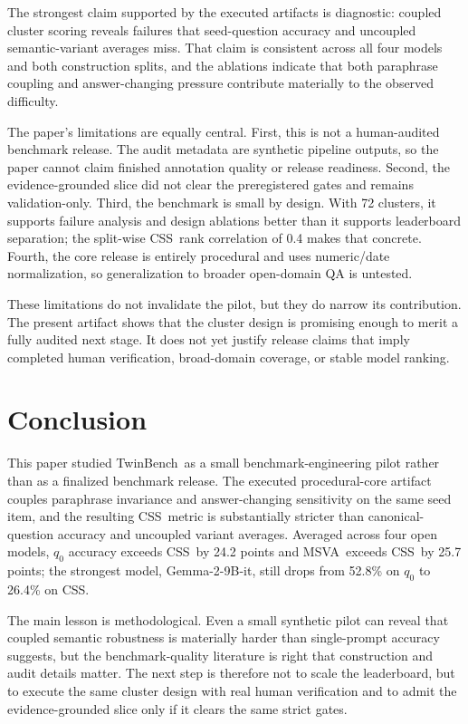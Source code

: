 \documentclass{article}
\newcommand{\tb}{TwinBench}
\newcommand{\css}{\textsc{CSS}}
\newcommand{\msva}{\textsc{MSVA}}
\begin{document}
The strongest claim supported by the executed artifacts is diagnostic: coupled cluster scoring reveals failures that seed-question accuracy and uncoupled semantic-variant averages miss. That claim is consistent across all four models and both construction splits, and the ablations indicate that both paraphrase coupling and answer-changing pressure contribute materially to the observed difficulty.

The paper's limitations are equally central. First, this is not a human-audited benchmark release. The audit metadata are synthetic pipeline outputs, so the paper cannot claim finished annotation quality or release readiness. Second, the evidence-grounded slice did not clear the preregistered gates and remains validation-only. Third, the benchmark is small by design. With 72 clusters, it supports failure analysis and design ablations better than it supports leaderboard separation; the split-wise \css\ rank correlation of 0.4 makes that concrete. Fourth, the core release is entirely procedural and uses numeric/date normalization, so generalization to broader open-domain QA is untested.

These limitations do not invalidate the pilot, but they do narrow its contribution. The present artifact shows that the cluster design is promising enough to merit a fully audited next stage. It does not yet justify release claims that imply completed human verification, broad-domain coverage, or stable model ranking.

\section{Conclusion}
\label{sec:conclusion}

This paper studied \tb\ as a small benchmark-engineering pilot rather than as a finalized benchmark release. The executed procedural-core artifact couples paraphrase invariance and answer-changing sensitivity on the same seed item, and the resulting \css\ metric is substantially stricter than canonical-question accuracy and uncoupled variant averages. Averaged across four open models, $q_0$ accuracy exceeds \css\ by 24.2 points and \msva\ exceeds \css\ by 25.7 points; the strongest model, Gemma-2-9B-it, still drops from 52.8\% on $q_0$ to 26.4\% on \css.

The main lesson is methodological. Even a small synthetic pilot can reveal that coupled semantic robustness is materially harder than single-prompt accuracy suggests, but the benchmark-quality literature is right that construction and audit details matter. The next step is therefore not to scale the leaderboard, but to execute the same cluster design with real human verification and to admit the evidence-grounded slice only if it clears the same strict gates.
\end{document}
